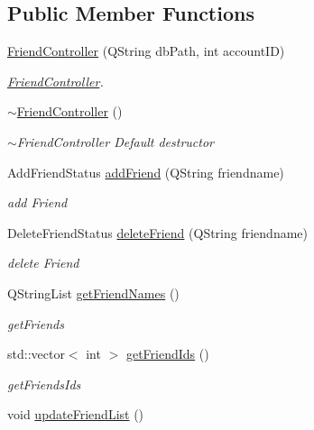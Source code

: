 \subsection*{Public Member Functions}
\begin{DoxyCompactItemize}
\item 
\hyperlink{classFriendController_a5c96f9851c482b29c5baaaa45b0bb971}{Friend\+Controller} (Q\+String db\+Path, int account\+ID)
\begin{DoxyCompactList}\small\item\em \hyperlink{classFriendController}{Friend\+Controller}. \end{DoxyCompactList}\item 
\hyperlink{classFriendController_a18ec512e658bf5e9e39b167ef40b925c}{$\sim$\+Friend\+Controller} ()\hypertarget{classFriendController_a18ec512e658bf5e9e39b167ef40b925c}{}\label{classFriendController_a18ec512e658bf5e9e39b167ef40b925c}

\begin{DoxyCompactList}\small\item\em $\sim$\+Friend\+Controller Default destructor \end{DoxyCompactList}\item 
Add\+Friend\+Status \hyperlink{classFriendController_ae1dcadea467911b774e90640e2b74d98}{add\+Friend} (Q\+String friendname)
\begin{DoxyCompactList}\small\item\em add Friend \end{DoxyCompactList}\item 
Delete\+Friend\+Status \hyperlink{classFriendController_adb5a3780263393f573f70c392a11cf4c}{delete\+Friend} (Q\+String friendname)
\begin{DoxyCompactList}\small\item\em delete Friend \end{DoxyCompactList}\item 
Q\+String\+List \hyperlink{classFriendController_aa43aa34b31aa3ad32d4bace87baa96a3}{get\+Friend\+Names} ()
\begin{DoxyCompactList}\small\item\em get\+Friends \end{DoxyCompactList}\item 
std\+::vector$<$ int $>$ \hyperlink{classFriendController_af32988ca2e523cf5d5183ffc3d0ea1b6}{get\+Friend\+Ids} ()
\begin{DoxyCompactList}\small\item\em get\+Friends\+Ids \end{DoxyCompactList}\item 
void \hyperlink{classFriendController_a5df174a1c9cb54ee74e8bb90ae8753d9}{update\+Friend\+List} ()\hypertarget{classFriendController_a5df174a1c9cb54ee74e8bb90ae8753d9}{}\label{classFriendController_a5df174a1c9cb54ee74e8bb90ae8753d9}


\end{DoxyCompactItemize}
